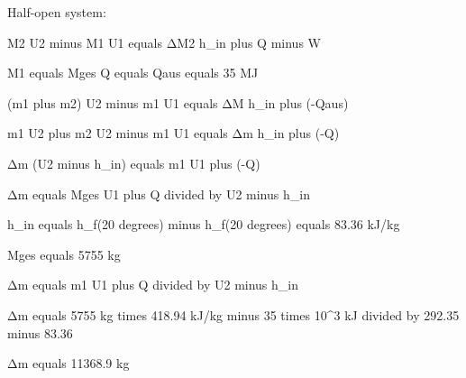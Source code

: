 Half-open system:  

M2 U2 minus M1 U1 equals ΔM2 h_in plus Q minus W  

M1 equals Mges  
Q equals Qaus equals 35 MJ  

(m1 plus m2) U2 minus m1 U1 equals ΔM h_in plus (-Qaus)  

m1 U2 plus m2 U2 minus m1 U1 equals Δm h_in plus (-Q)  

Δm (U2 minus h_in) equals m1 U1 plus (-Q)  

Δm equals Mges U1 plus Q divided by U2 minus h_in  

h_in equals h_f(20 degrees) minus h_f(20 degrees) equals 83.36 kJ/kg  

Mges equals 5755 kg  

Δm equals m1 U1 plus Q divided by U2 minus h_in  

Δm equals 5755 kg times 418.94 kJ/kg minus 35 times 10^3 kJ divided by 292.35 minus 83.36  

Δm equals 11368.9 kg